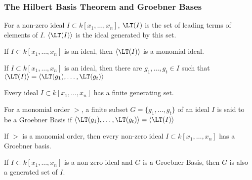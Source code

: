             \subsubsection{The Hilbert Basis Theorem and Groebner Bases}
                \begin{definition}
                    For a non-zero ideal $I\subset k[x_1,\hdots ,x_n]$,
                    $\LT(I)$ is the set of leading terms of elements
                    of $I$. $\langle \LT(I)\rangle$ is the ideal
                    generated by this set.
                \end{definition}
                \begin{theorem}
                    If $I\subset k[x_1,\hdots ,x_n]$ is an ideal,
                    then $\langle \LT(I)\rangle$ is a monomial ideal.
                \end{theorem}
                \begin{theorem}
                    If $I\subset k[x_1,\hdots ,x_n]$ is an ideal,
                    then there are $g_1,\hdots, g_t\in I$ such that
                    $\langle\LT(I)\rangle%
                     =\langle\LT(g_1),\hdots,\LT(g_t)\rangle$
                \end{theorem}
                \begin{theorem}
                    Every ideal $I\subset k[x_1,\hdots,x_n]$
                    has a finite generating set.
                \end{theorem}
                \begin{definition}
                    For a monomial order $>$, a finite subset
                    $G=\{g_1,\hdots, g_t\}$ of an ideal $I$ is
                    said to be a Groebner Basis if
                    $\langle\LT(g_1),\hdots,\LT(g_t)\rangle%
                     =\langle \LT(I)\rangle$
                \end{definition}
                \begin{theorem}
                    If $>$ is a monomial order, then every non-zero
                    ideal $I\subset k[x_1,\hdots,x_n]$ has a Groebner basis.
                \end{theorem}
                \begin{theorem}
                    If $I\subset k[x_1,\hdots ,x_n]$ is a non-zero
                    ideal and $G$ is a Groebner Basis, then $G$
                    is also a generated set of $I$.
                \end{theorem}
